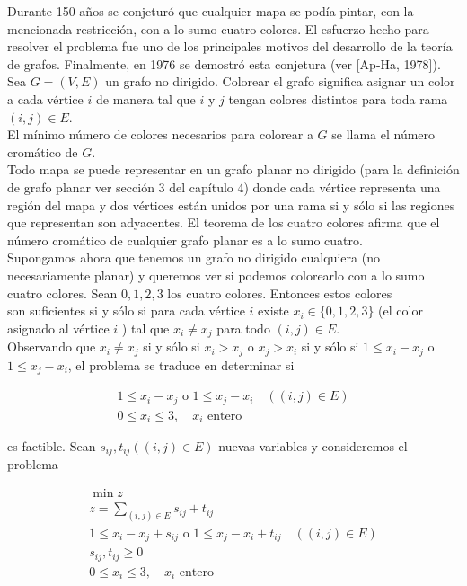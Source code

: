 \documentclass[10pt]{article}
\begin{document}
Durante 150 años se conjeturó que cualquier mapa se podía pintar, con la mencionada restricción, con a lo sumo cuatro colores. El esfuerzo hecho para resolver el problema fue uno de los principales motivos del desarrollo de la teoría de grafos. Finalmente, en 1976 se demostró esta conjetura (ver [Ap-Ha, 1978]).\\
Sea $G=(V, E)$ un grafo no dirigido. Colorear el grafo significa asignar un color a cada vértice $i$ de manera tal que $i$ y $j$ tengan colores distintos para toda rama $(i, j) \in E$.\\
El mínimo número de colores necesarios para colorear a $G$ se llama el número cromático de $G$.\\
Todo mapa se puede representar en un grafo planar no dirigido (para la definición de grafo planar ver sección 3 del capítulo 4) donde cada vértice representa una región del mapa y dos vértices están unidos por una rama si y sólo si las regiones que representan son adyacentes. El teorema de los cuatro colores afirma que el número cromático de cualquier grafo planar es a lo sumo cuatro.\\
Supongamos ahora que tenemos un grafo no dirigido cualquiera (no necesariamente planar) y queremos ver si podemos colorearlo con a lo sumo cuatro colores. Sean $0,1,2,3$ los cuatro colores. Entonces estos colores\\
son suficientes si y sólo si para cada vértice $i$ existe $x_{i} \in\{0,1,2,3\}$ (el color asignado al vértice $i$ ) tal que $x_{i} \neq x_{j}$ para todo $(i, j) \in E$.\\
Observando que $x_{i} \neq x_{j}$ si y sólo si $x_{i}>x_{j}$ o $x_{j}>x_{i}$ si y sólo si $1 \leq x_{i}-x_{j}$ o $1 \leq x_{j}-x_{i}$, el problema se traduce en determinar si


\begin{gather*}
1 \leq x_{i}-x_{j} \text { o } 1 \leq x_{j}-x_{i} \quad((i, j) \in E)  \tag{6}\\
0 \leq x_{i} \leq 3, \quad x_{i} \text { entero }
\end{gather*}


es factible. Sean $s_{i j}, t_{i j}((i, j) \in E)$ nuevas variables y consideremos el problema


\begin{gather*}
\min z \\
z=\sum_{(i, j) \in E} s_{i j}+t_{i j} \\
1 \leq x_{i}-x_{j}+s_{i j} \text { o } 1 \leq x_{j}-x_{i}+t_{i j} \quad((i, j) \in E)  \tag{7}\\
s_{i j}, t_{i j} \geq 0 \\
0 \leq x_{i} \leq 3, \quad x_{i} \text { entero }
\end{gather*}
\end{document}
